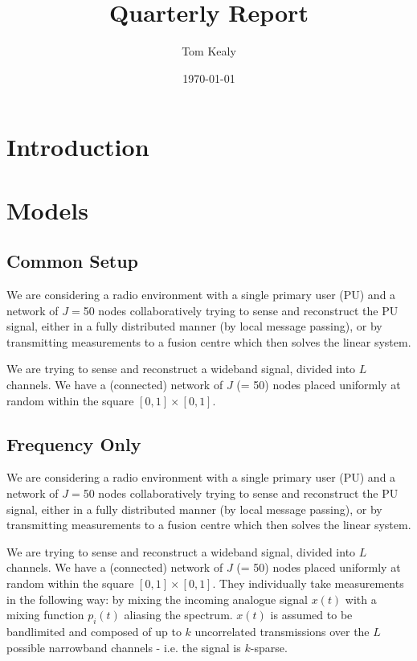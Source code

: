 \documentclass{article}
\title{Quarterly Report}
\begin{document}
\date{\today}
\author{Tom Kealy}
\maketitle
\section{Introduction}


\section{Models}

\subsection{Common Setup}
We are considering a radio environment with a single primary user (PU) and a network of \(J=\)50 nodes collaboratively trying to sense and reconstruct the PU signal, either in a fully distributed manner (by local message passing), or by transmitting measurements to a fusion centre which then solves the linear system. 

We are trying to sense and reconstruct a wideband signal, divided into \(L\) channels. We have a (connected) network of \(J\) (= 50) nodes placed uniformly at random within the square \(  \left[0,1\right]\times \left[0,1\right] \).

\subsection{Frequency Only}

\label{sensingmodel}
We are considering a radio environment with a single primary user (PU) and a network of \(J=\)50 nodes collaboratively trying to sense and reconstruct the PU signal, either in a fully distributed manner (by local message passing), or by transmitting measurements to a fusion centre which then solves the linear system. 

We are trying to sense and reconstruct a wideband signal, divided into \(L\) channels. We have a (connected) network of \(J\) (= 50) nodes placed uniformly at random within the square \(  \left[0,1\right]\times \left[0,1\right] \). They individually take measurements in the following way: by mixing the incoming analogue signal \(x\left(t\right)\) with a mixing function \(p_i\left(t\right)\) aliasing the spectrum. \(x\left(t\right)\) is assumed to be bandlimited and composed of up to \(k\) uncorrelated transmissions over the \(L\) possible narrowband channels - i.e. the signal is \(k\)-sparse. 
\end{document}
